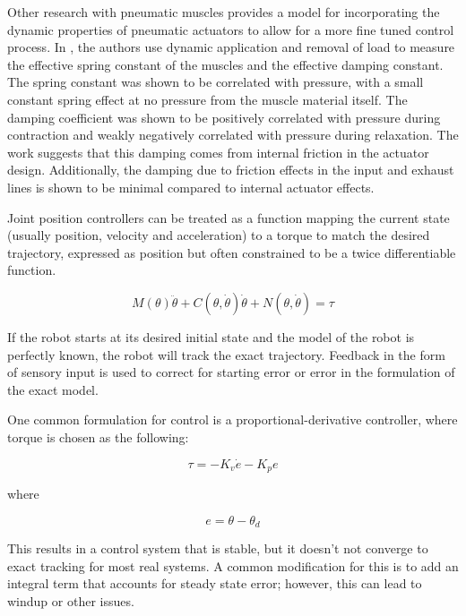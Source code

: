 Other research with pneumatic muscles provides a model for incorporating the
dynamic properties of pneumatic actuators to allow for a more fine tuned control
process. In \cite{DynamicPMuscles}, the authors use dynamic application and
removal of load to measure the effective spring constant of the muscles and the
effective damping constant. The spring constant was shown to be correlated with
pressure, with a small constant spring effect at no pressure from the muscle
material itself. The damping coefficient was shown to be positively correlated
with pressure during contraction and weakly negatively correlated with pressure
during relaxation. The work suggests that this damping comes from internal
friction in the actuator design. Additionally, the damping due to friction
effects in the input and exhaust lines is shown to be minimal compared to
internal actuator effects. \cite{DynamicPMuscles}

\cite{einstein}


Joint position controllers can be treated as a function mapping the current
state (usually position, velocity and acceleration) to a torque to match the 
desired trajectory, expressed as position but often constrained to be a twice
differentiable function.

\begin{equation}
M(\theta) \ddot{\theta} + C(\theta, \dot{\theta}) \dot{\theta} + N(\theta, \dot{\theta}) = \tau
\end{equation}

If the robot starts at its desired initial state and the model of the robot is
perfectly known, the robot will track the exact trajectory. Feedback in the 
form of sensory input is used to correct for starting error or error in the 
formulation of the exact model.

One common formulation for control is a proportional-derivative controller, 
where torque is chosen as the following:

\begin{equation}
\tau = -K_{v} \dot{e} - K_{p} e
\end{equation}

where

\begin{equation}
e = \theta - \theta_{d}
\end{equation}

This results in a control system that is stable, but it doesn't not converge to
exact tracking for most real systems. A common modification for this is to add
an integral term that accounts for steady state error; however, this can lead to
windup or other issues.

